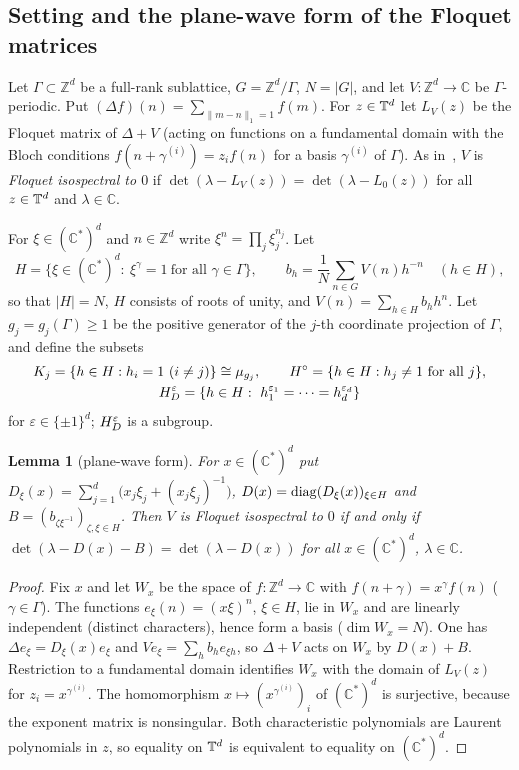 \documentclass[11pt]{amsart}
\newtheorem{lemma}[theorem]{Lemma}
\theoremstyle{definition}
\theoremstyle{remark}
\providecommand{\C}{\mathbb C}
\providecommand{\Z}{\mathbb Z}
\begin{document}
\subsection{Setting and the plane-wave form of the Floquet matrices}
\label{R3:ss:setting}

Let $\Gamma\subset\Z^d$ be a full-rank sublattice, $G=\Z^d/\Gamma$, $N=|G|$,
and let $V:\Z^d\to\C$ be $\Gamma$-periodic. Put
$(\Delta f)(n)=\sum_{\|m-n\|_1=1}f(m)$. For $z\in\mathbb{T}^d$ let $L_V(z)$ be the
Floquet matrix of $\Delta+V$ (acting on functions on a fundamental domain with
the Bloch conditions $f(n+\gamma^{(i)})=z_if(n)$ for a basis $\gamma^{(i)}$ of
$\Gamma$). As in~\cite{R3-FFORS,R3-CFK}, $V$ is \emph{Floquet isospectral to
$0$} if $\det(\lambda-L_V(z))=\det(\lambda-L_0(z))$ for all $z\in\mathbb{T}^d$ and
$\lambda\in\C$.

For $\xi\in(\C^*)^d$ and $n\in\Z^d$ write $\xi^n=\prod_j\xi_j^{n_j}$. Let
\[
 H=\{\xi\in(\C^*)^d:\ \xi^\gamma=1\ \text{for all }\gamma\in\Gamma\},\qquad
 b_h=\frac1N\sum_{n\in G}V(n)h^{-n}\quad(h\in H),
\]
so that $|H|=N$, $H$ consists of roots of unity, and $V(n)=\sum_{h\in H}b_hh^n$.
Let $g_j=g_j(\Gamma)\ge1$ be the positive generator of the $j$-th coordinate
projection of $\Gamma$, and define the subsets
\begin{gather*}
 K_j=\{h\in H: h_i=1\ (i\ne j)\}\cong\mu_{g_j},\qquad
 \Hcirc=\{h\in H: h_j\neq1\ \text{for all }j\},\\
 \Hdiag{\varepsilon}=\{h\in H:\ h_1^{\varepsilon_1}=\dots=h_d^{\varepsilon_d}\}
\end{gather*}
for $\varepsilon\in\{\pm1\}^d$; $H_{D}^{\varepsilon}$ is a subgroup.

\begin{lemma}[plane-wave form]\label{R3:lem:planewave}
For $x\in(\C^*)^d$ put $D_\xi(x)=\sum_{j=1}^d\bigl(x_j\xi_j+(x_j\xi_j)^{-1}\bigr)$,
$D(x)=\operatorname{diag}(D_\xi(x))_{\xi\in H}$ and $B=(b_{\zeta\xi^{-1}})_{\zeta,\xi\in H}$.
Then $V$ is Floquet isospectral to $0$ if and only if
$\det(\lambda-D(x)-B)=\det(\lambda-D(x))$ for all $x\in(\C^*)^d$, $\lambda\in\C$.
\end{lemma}

\begin{proof}
Fix $x$ and let $W_x$ be the space of $f:\Z^d\to\C$ with $f(n+\gamma)=x^\gamma f(n)$
($\gamma\in\Gamma$). The functions $e_\xi(n)=(x\xi)^n$, $\xi\in H$, lie in $W_x$
and are linearly independent (distinct characters), hence form a basis
($\dim W_x=N$). One has $\Delta e_\xi=D_\xi(x)e_\xi$ and
$Ve_\xi=\sum_hb_he_{\xi h}$, so $\Delta+V$ acts on $W_x$ by $D(x)+B$. Restriction
to a fundamental domain identifies $W_x$ with the domain of $L_V(z)$ for
$z_i=x^{\gamma^{(i)}}$. The homomorphism $x\mapsto(x^{\gamma^{(i)}})_i$ of
$(\C^*)^d$ is surjective, because the exponent matrix is nonsingular. Both
characteristic polynomials are Laurent polynomials in $z$, so equality on $\mathbb{T}^d$ is
equivalent to equality on $(\C^*)^d$.
\end{proof}
\end{document}
